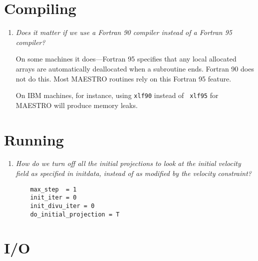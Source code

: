 \section{Compiling}

\begin{enumerate}

\item {\em Does it matter if we use a Fortran 90 compiler instead of a 
   Fortran 95 compiler?}


   On some machines it does---Fortran 95 specifies that any local
   allocated arrays are automatically deallocated when a subroutine
   ends.  Fortran 90 does not do this.  Most MAESTRO routines rely 
   on this Fortran 95 feature.  

   On IBM machines, for instance, using {\tt xlf90} instead of {\tt
     xlf95} for MAESTRO will produce memory leaks.

  

\end{enumerate}

\section{Running}

\begin{enumerate}

\item {\em  How do we turn off all the initial projections to look at the
   initial velocity field as specified in initdata, instead of as
   modified by the velocity constraint?} 
%
\begin{verbatim}
    max_step  = 1
    init_iter = 0
    init_divu_iter = 0
    do_initial_projection = T
\end{verbatim}

\end{enumerate}


\section{I/O}

